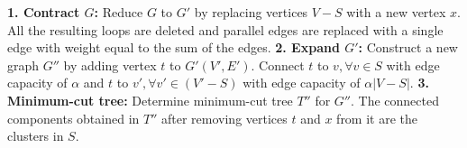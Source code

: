 \documentclass{sig-alternate}
\begin{document}
\newcommand{\LocalCutClustering}{\ensuremath{\mbox{\sc LocalCutClustering}}}
\begin{algorithm}
\caption{$\LocalCutClustering(S)$}\label{alg:cluster-recluster}
\begin{algorithmic}
\STATE \textbf{1. Contract $G$:} Reduce $G$ to  $G'$ by replacing
vertices $V-S$ with a new vertex $x$. All the resulting loops are deleted and parallel
edges are replaced with a single edge with weight equal to the sum of the
edges.%
\STATE \textbf{2. Expand $G'$:} Construct a new graph $G''$ by
adding vertex $t$ to $G'(V', E')$. Connect $t$ to $v, \forall v \in S$ with
edge capacity of $\alpha$ and $t$ to $v', \forall v' \in (V'-S)$ with edge
capacity of $\alpha|V-S|$.%
\STATE \textbf{3. Minimum-cut tree:} Determine minimum-cut tree
$T''$ for $G''$. The connected components obtained in $T''$ after removing vertices $t$ and $x$ from it are
the clusters in $S$. 
\end{algorithmic}
\label{alg2}
\end{algorithm}









\end{document}
